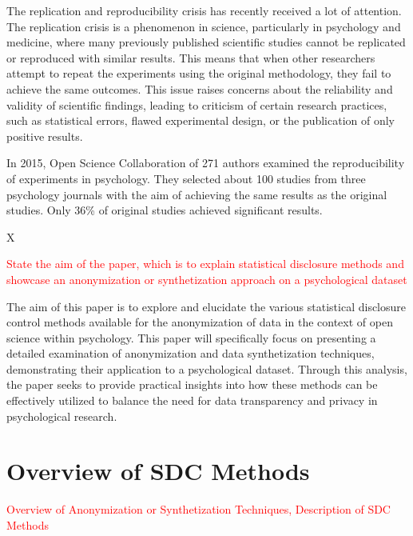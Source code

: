 \documentclass{article}
\begin{document}
The replication and reproducibility crisis has recently received a lot of attention. 
The replication crisis is a phenomenon in science, particularly in psychology and medicine, where many previously published scientific studies cannot be replicated or reproduced with similar results. This means that when other researchers attempt to repeat the experiments using the original methodology, they fail to achieve the same outcomes. This issue raises concerns about the reliability and validity of scientific findings, leading to criticism of certain research practices, such as statistical errors, flawed experimental design, or the publication of only positive results.

In 2015, Open Science Collaboration \cite{2015_OSC} of 271 authors examined the reproducibility of experiments in psychology. They selected about 100 studies from three psychology journals with the aim of achieving the same results as the original studies.  Only 36\% of original studies achieved significant results.


X
\newline

\textcolor{red}{State the aim of the paper, which is to explain statistical disclosure methods and showcase an anonymization or synthetization approach on a psychological dataset}

The aim of this paper is to explore and elucidate the various statistical disclosure control methods available for the anonymization of data in the context of open science within psychology. This paper will specifically focus on presenting a detailed examination of anonymization and data synthetization techniques, demonstrating their application to a psychological dataset. Through this analysis, the paper seeks to provide practical insights into how these methods can be effectively utilized to balance the need for data transparency and privacy in psychological research.

\section{Overview of SDC Methods}

\textcolor{red}{Overview of Anonymization or Synthetization Techniques, Description of SDC Methods}
\end{document}
